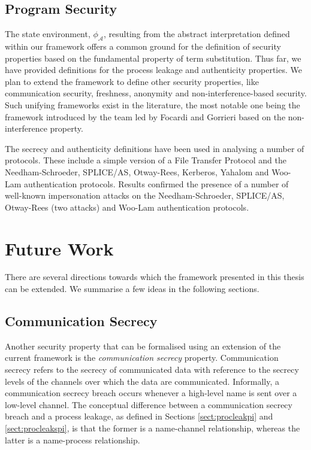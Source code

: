 \documentclass[10pt,a4paper,final,oneside,fleqn]{book}
\begin{document}
\subsection{Program Security}
The state environment, $\phi_\mathcal{A}$, resulting from the abstract interpretation defined within our framework offers a common ground for the definition of security properties based on the fundamental property of term substitution. Thus far, we have provided definitions for the process leakage and authenticity properties. We plan to extend the framework to define other security properties, like communication security, freshness, anonymity and non-interference-based security. Such unifying frameworks exist in the literature, the most notable one being the framework introduced by the team led by Focardi and Gorrieri \cite{focardi8} based on the non-interference property.

The secrecy and authenticity definitions have been used in analysing a number of protocols.  These include a simple version of a File Transfer Protocol and the Needham-Schroeder, SPLICE/AS, Otway-Rees, Kerberos, Yahalom and Woo-Lam authentication protocols. Results confirmed the presence of a number of well-known impersonation attacks on the Needham-Schroeder, SPLICE/AS, Otway-Rees (two attacks) and Woo-Lam authentication protocols.
\section{Future Work}
There are several directions towards which the framework presented in this thesis can be extended.  We summarise a few ideas in the following sections.
\subsection{Communication Secrecy}
Another security property that can be formalised using an extension of the current framework is the {\itshape communication secrecy\/} property. Communication secrecy refers to the secrecy of communicated data with reference to the secrecy levels of the channels over which the data are communicated.  Informally, a communication secrecy breach occurs whenever a high-level name is sent over a low-level channel. The conceptual difference between a communication secrecy breach and a process leakage, as defined in Sections \ref{sect:procleakpi} and \ref{sect:procleakspi}, is that the former is a name-channel relationship, whereas the latter is a name-process relationship.
\end{document}
